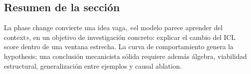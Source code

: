 \subsection{Resumen de la sección}

La phase change convierte una idea vaga, «el modelo parece aprender del context», en un objetivo de investigación concreto: explicar el cambio del ICL score dentro de una ventana estrecha. La curva de comportamiento genera la hypothesis; una conclusión mecanicista sólida requiere además álgebra, viabilidad estructural, generalización entre ejemplos y causal ablation.

